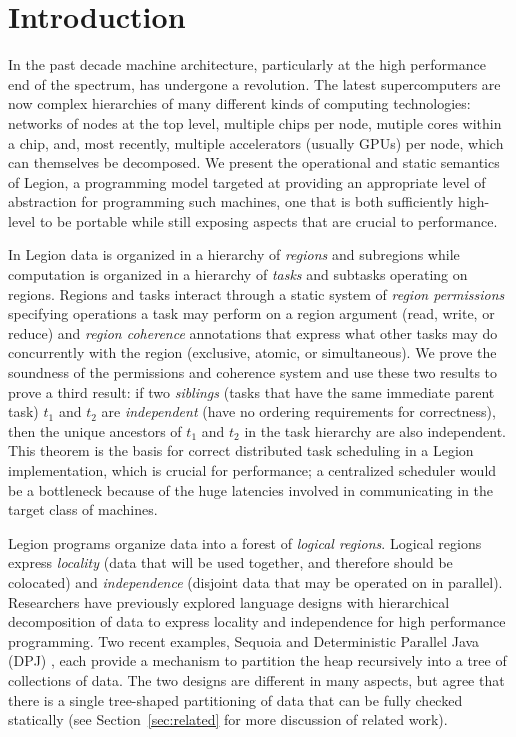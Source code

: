 

\section{Introduction}
\label{sec:intro}

In the past decade machine architecture, particularly at the high
performance end of the spectrum, has undergone a revolution.  The
latest supercomputers are now complex hierarchies of many different
kinds of computing technologies: networks of nodes at the top level,
multiple chips per node, mutiple cores within a chip, and, most
recently, multiple accelerators (usually GPUs) per node, which 
can themselves be decomposed.  We present the operational and static
semantics of Legion\cite{Legion12}, a programming model targeted at providing an
appropriate level of abstraction for programming such machines, one
that is both sufficiently high-level to be portable while still
exposing aspects that are crucial to performance. 

In Legion data is organized in a hierarchy of {\em regions}
and subregions while computation is organized in a hierarchy of {\em
tasks} and subtasks operating on regions.  Regions and tasks interact
through a static system of {\em region permissions} specifying 
operations a task may perform on a region argument (read,
write, or reduce) and  {\em region coherence} annotations that
express what other tasks may do concurrently with
the region (exclusive, atomic, or simultaneous).  We prove the
soundness of the permissions and coherence system and use these two
results to prove a third result: if two {\em siblings} (tasks that
have the same immediate parent task) $t_1$ and $t_2$ are 
{\em independent} (have no ordering requirements for correctness), 
then the unique ancestors of $t_1$ and $t_2$ in the task hierarchy 
are also independent.  This theorem is the basis for correct distributed
task scheduling in a Legion implementation, which is crucial for
performance; a centralized scheduler would be a bottleneck
because of the huge latencies involved in communicating in the target
class of machines.

Legion programs organize data into a forest of {\em logical regions}.  Logical
regions express {\em locality} (data that will be used together, and therefore should be colocated) 
and {\em independence} (disjoint data that may be operated on in parallel).
Researchers have previously explored language designs with hierarchical decomposition of data to express
locality and independence for high performance programming. Two recent examples, Sequoia \cite{Fatahalian06} and 
Deterministic Parallel Java (DPJ) \cite{Bocchino09}, each provide a mechanism to partition the heap recursively
into a tree of collections of data.  The two designs are different in many aspects, but agree that there is
a single tree-shaped partitioning of data that can be fully checked statically (see Section~\ref{sec:related} for more
discussion of related work).

